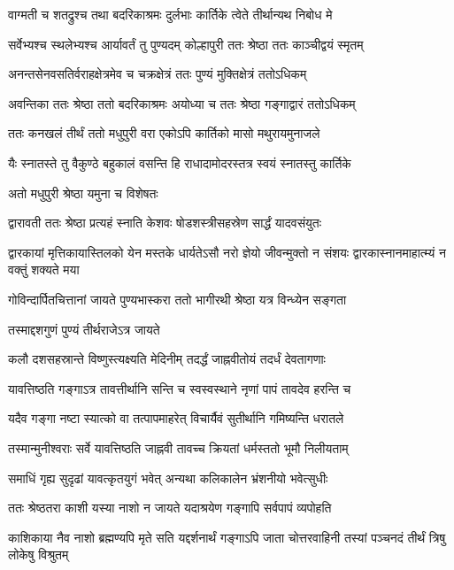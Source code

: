 \twolineshloka
{वाग्मती च शतद्रुश्च तथा बदरिकाश्रमः}
{दुर्लभाः कार्तिके त्वेते तीर्थान्यथ निबोध मे} %

\twolineshloka
{सर्वेभ्यश्च स्थलेभ्यश्च आर्यावर्तं तु पुण्यदम्}
{कोल्हापुरी ततः श्रेष्ठा ततः काञ्चीद्वयं स्मृतम्} %

\twolineshloka
{अनन्तसेनवसतिर्वराहक्षेत्रमेव च}
{चक्रक्षेत्रं ततः पुण्यं मुक्तिक्षेत्रं ततोऽधिकम्} %

\twolineshloka
{अवन्तिका ततः श्रेष्ठा ततो बदरिकाश्रमः}
{अयोध्या च ततः श्रेष्ठा गङ्गाद्वारं ततोऽधिकम्} %

\twolineshloka
{ततः कनखलं तीर्थं ततो मधुपुरी वरा}
{एकोऽपि कार्तिको मासो मथुरायमुनाजले} %

\twolineshloka
{यैः स्नातस्ते तु वैकुण्ठे बहुकालं वसन्ति हि}
{राधादामोदरस्तत्र स्वयं स्नातस्तु कार्तिके} %


\onelineshloka
{अतो मधुपुरी श्रेष्ठा यमुना च विशेषतः} %

\twolineshloka
{द्वारावती ततः श्रेष्ठा प्रत्यहं स्नाति केशवः}
{षोडशस्त्रीसहस्रेण सार्द्धं यादवसंयुतः} %

\threelineshloka
{द्वारकायां मृत्तिकायास्तिलको येन मस्तके}
{धार्यतेऽसौ नरो ज्ञेयो जीवन्मुक्तो न संशयः}
{द्वारकास्नानमाहात्म्यं न वक्तुं शक्यते मया} %

\twolineshloka
{गोविन्दार्पितचित्तानां जायते पुण्यभास्करा}
{ततो भागीरथी श्रेष्ठा यत्र विन्ध्येन सङ्गता} %


\onelineshloka
{तस्माद्दशगुणं पुण्यं तीर्थराजेऽत्र जायते} %

\twolineshloka
{कलौ दशसहस्रान्ते विष्णुस्त्यक्ष्यति मेदिनीम्}
{तदर्द्धं जाह्नवीतोयं तदर्धं देवतागणाः} %

\twolineshloka
{यावत्तिष्ठति गङ्गाऽत्र तावत्तीर्थानि सन्ति च}
{स्वस्वस्थाने नृणां पापं तावदेव हरन्ति च} %

\twolineshloka
{यदैव गङ्गा नष्टा स्यात्को वा तत्पापमाहरेत्}
{विचार्यैवं सुतीर्थानि गमिष्यन्ति धरातले} %

\twolineshloka
{तस्मान्मुनीश्वराः सर्वे यावत्तिष्ठति जाह्नवी}
{तावच्च क्रियतां धर्मस्ततो भूमौ निलीयताम्} %

\twolineshloka
{समाधिं गृह्य सुदृढां यावत्कृतयुगं भवेत्}
{अन्यथा कलिकालेन भ्रंशनीयो भवेत्सुधीः} %

\twolineshloka
{ततः श्रेष्ठतरा काशी यस्या नाशो न जायते}
{यदाश्रयेण गङ्गापि सर्वपापं व्यपोहति} %

\threelineshloka
{काशिकाया नैव नाशो ब्रह्मण्यपि मृते सति}
{यद्दर्शनार्थं गङ्गाऽपि जाता चोत्तरवाहिनी}
{तस्यां पञ्चनदं तीर्थं त्रिषु लोकेषु विश्रुतम्} %


